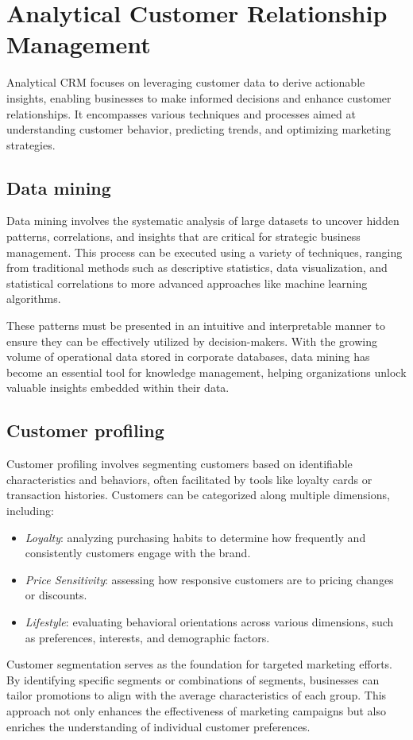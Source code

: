 \section{Analytical Customer Relationship Management}

Analytical CRM focuses on leveraging customer data to derive actionable insights, enabling businesses to make informed decisions and enhance customer relationships. 
It encompasses various techniques and processes aimed at understanding customer behavior, predicting trends, and optimizing marketing strategies.

\subsection{Data mining}
Data mining involves the systematic analysis of large datasets to uncover hidden patterns, correlations, and insights that are critical for strategic business management. 
This process can be executed using a variety of techniques, ranging from traditional methods such as descriptive statistics, data visualization, and statistical correlations to more advanced approaches like machine learning algorithms.

These patterns must be presented in an intuitive and interpretable manner to ensure they can be effectively utilized by decision-makers. 
With the growing volume of operational data stored in corporate databases, data mining has become an essential tool for knowledge management, helping organizations unlock valuable insights embedded within their data.

\subsection{Customer profiling}
Customer profiling involves segmenting customers based on identifiable characteristics and behaviors, often facilitated by tools like loyalty cards or transaction histories. 
Customers can be categorized along multiple dimensions, including:
\begin{itemize}
    \item \textit{Loyalty}: analyzing purchasing habits to determine how frequently and consistently customers engage with the brand.
    \item \textit{Price Sensitivity}: assessing how responsive customers are to pricing changes or discounts.
    \item \textit{Lifestyle}: evaluating behavioral orientations across various dimensions, such as preferences, interests, and demographic factors.
\end{itemize}
\noindent Customer segmentation serves as the foundation for targeted marketing efforts. 
By identifying specific segments or combinations of segments, businesses can tailor promotions to align with the average characteristics of each group.
This approach not only enhances the effectiveness of marketing campaigns but also enriches the understanding of individual customer preferences.

